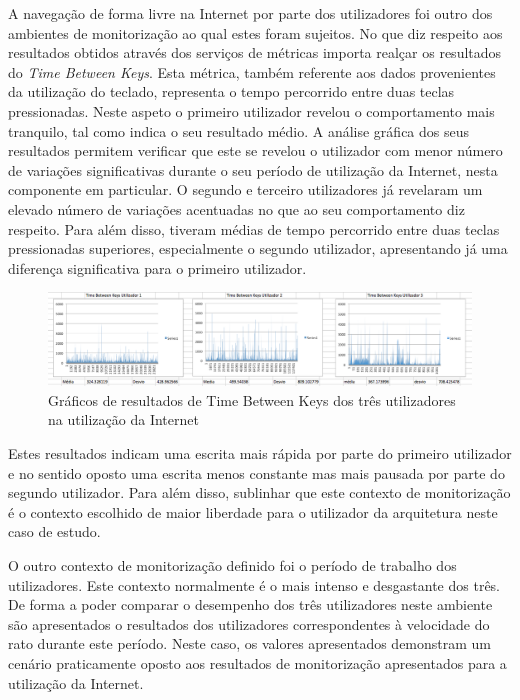 A navegação de forma livre na Internet por parte dos utilizadores foi outro dos ambientes de monitorização ao qual estes foram sujeitos. No que diz respeito aos resultados obtidos através dos serviços de métricas importa realçar os resultados do \textit{Time Between Keys}. Esta métrica, também referente aos dados provenientes da utilização do teclado, representa o tempo percorrido entre duas teclas pressionadas. Neste aspeto o primeiro utilizador revelou o comportamento mais tranquilo, tal como indica o seu resultado médio. A análise gráfica dos seus resultados permitem verificar que este se revelou o utilizador com menor número de variações significativas durante o seu período de utilização da Internet, nesta componente em particular. O segundo e terceiro utilizadores já revelaram um elevado número de variações acentuadas no que ao seu comportamento diz respeito. Para além disso, tiveram médias de tempo percorrido entre duas teclas pressionadas superiores, especialmente o segundo utilizador, apresentando já uma diferença significativa para o primeiro utilizador.

\begin{figure}[htb]
   \centering
   \includegraphics[scale=0.3]{Images/timebetweenkeys.png}
   \caption{Gráficos de resultados de Time Between Keys dos três utilizadores na utilização da Internet}
\end{figure}

Estes resultados indicam uma escrita mais rápida por parte do primeiro utilizador e no sentido oposto uma escrita menos constante mas mais pausada por parte do segundo utilizador. Para além disso, sublinhar que este contexto de monitorização é o contexto escolhido de maior liberdade para o utilizador da arquitetura neste caso de estudo.

O outro contexto de monitorização definido foi o período de trabalho dos utilizadores. Este contexto normalmente é o mais intenso e desgastante dos três. De forma a poder comparar o desempenho dos três utilizadores neste ambiente são apresentados o resultados dos utilizadores correspondentes à velocidade do rato durante este período. Neste caso, os valores apresentados demonstram um cenário praticamente oposto aos resultados de monitorização apresentados para a utilização da Internet.

